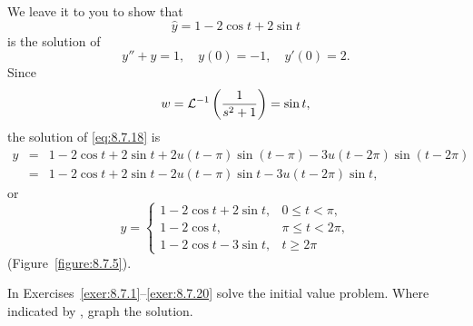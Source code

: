 \begin{examplesolution}
\solution We leave it to you to show that
\[
  \hat{y}=1-2\cos t+2\sin t
\]
is the solution of
\[
  y''+y=1,\quad y(0)=-1,\quad y'(0)=2.
\]
Since
\[
  w={\cal L}^{-1}\left(\frac{1}{s^{2}+1}\right)=\sin t,
\]
the solution of \eqref{eq:8.7.18} is
\begin{eqnarray*}
  y & = & 1-2\cos t+2\sin t+2u(t-\pi)\sin(t-\pi)-3u(t-2\pi)\sin(t-2\pi) \\
    & = & 1-2\cos t+2\sin t-2u(t-\pi)\sin t-3u(t-2\pi)\sin t,
\end{eqnarray*}
or
\begin{equation}
  \label{eq:8.7.19}y=\left\{
  \begin{array}{cl}
    1-2\cos t+2\sin t, & 0\le t<\pi,    \\[5pt]
    1-2\cos t,         & \pi\le t<2\pi, \\[5pt]
    1-2\cos t-3\sin t, & t\ge2\pi
  \end{array}\right.
\end{equation}
(Figure~\ref{figure:8.7.5}).
\end{examplesolution}

\exercises In Exercises~\ref{exer:8.7.1}--\ref{exer:8.7.20} solve the initial value problem. Where indicated by \CGex, graph the solution.

